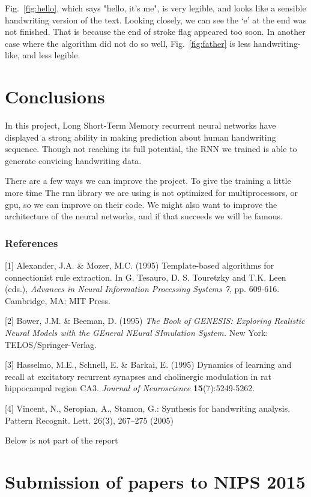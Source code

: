 \documentclass{article} %
\newcommand{\fref}[1]{Fig.~\ref{fig:#1}}
\begin{document}
\fref{hello}, which says "hello, it's me", is very legible, and looks like a sensible handwriting version of the text. Looking closely, we can see the ‘e’ at the end was not finished. That is because the end of stroke flag appeared too soon. In another case where the algorithm did not do so well, \fref{father} is less handwriting-like, and less legible.  

\section{Conclusions}
In this project, Long Short-Term Memory recurrent neural networks have displayed a strong ability in making prediction about human handwriting sequence. Though not reaching its full potential, the RNN we trained is able to generate convicing handwriting data. 

There are a few ways we can improve the project. 
To give the training a little more time
The rnn library we are using is not optimized for multiprocessors, or gpu, so we can improve on their code. 
We might also want to improve the architecture of the neural networks, and if that succeeds we will be famous. 




\subsubsection*{References}

\small{
[1] Alexander, J.A. \& Mozer, M.C. (1995) Template-based algorithms
for connectionist rule extraction. In G. Tesauro, D. S. Touretzky
and T.K. Leen (eds.), {\it Advances in Neural Information Processing
Systems 7}, pp. 609-616. Cambridge, MA: MIT Press.

[2] Bower, J.M. \& Beeman, D. (1995) {\it The Book of GENESIS: Exploring
Realistic Neural Models with the GEneral NEural SImulation System.}
New York: TELOS/Springer-Verlag.

[3] Hasselmo, M.E., Schnell, E. \& Barkai, E. (1995) Dynamics of learning
and recall at excitatory recurrent synapses and cholinergic modulation
in rat hippocampal region CA3. {\it Journal of Neuroscience}
{\bf 15}(7):5249-5262.
}

[4] Vincent, N., Seropian, A., Stamon, G.: Synthesis for handwriting
analysis. Pattern Recognit. Lett. 26(3), 267–275 (2005)



Below is not part of the report

\section{Submission of papers to NIPS 2015}
\end{document}
